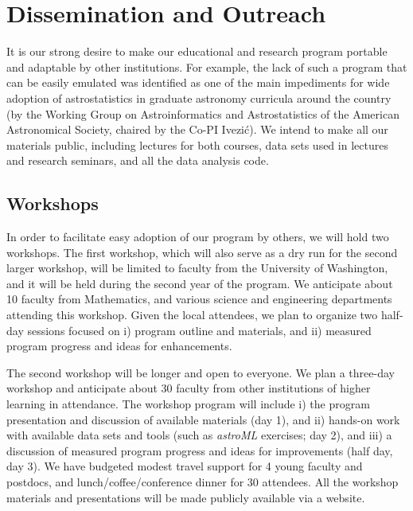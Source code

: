 \section{Dissemination and Outreach}
\label{sec:outreach}


It is our strong desire to make our educational and research
program portable and adaptable by other institutions. For example, 
the lack of such a program that can be easily emulated was identified 
as one of the main impediments for wide adoption of astrostatistics
in graduate astronomy curricula around the country (by the Working 
Group on Astroinformatics and Astrostatistics of the American Astronomical
Society, chaired by the Co-PI Ivezi\'{c}).  We intend to make all our
materials public, including lectures for both courses, data sets used
in lectures and research seminars, and all the data analysis code. 


\subsection{Workshops} 
\label{sec:workshop}

In order to facilitate easy adoption of our program by others, we will
hold two workshops. The first workshop, which will also serve as a dry
run for the second larger workshop, will be limited to faculty from
the University of Washington, and it will be held during the second
year of the program. We anticipate about 10 faculty from Mathematics,
and various
science and engineering departments attending this workshop. Given the
local attendees, we plan to organize two half-day sessions focused on
i) program outline and materials, and ii) measured program progress
and ideas for enhancements.

The second workshop will be longer and open to everyone. We plan a 
three-day workshop and anticipate about 30 faculty from other
institutions of higher learning in attendance. The workshop program
will include i) the program presentation and discussion of available 
materials (day 1), and ii) hands-on work with available data sets and
tools (such as {\it astroML} exercises; day 2), and iii) a discussion
of measured program progress and ideas for improvements (half day, day
3). We have budgeted modest travel support for 4 young faculty and
postdocs, and lunch/coffee/conference dinner for 30 attendees. 
All the workshop materials and presentations will be made publicly
available via a website. 

